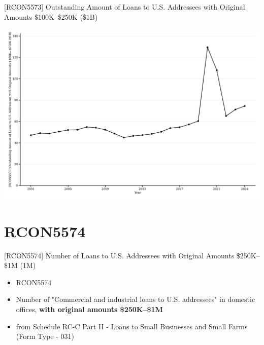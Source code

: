\documentclass{beamer}
\begin{document}
\begin{frame}{[RCON5573] Outstanding Amount of Loans to U.S. Addressees with Original Amounts \$100K–\$250K (\$1B)}
\begin{center}
\includegraphics[width=1\textwidth]{figures/Figure_RCON5573_Outstanding_100K_250K.pdf}
\end{center}
\end{frame}


\section{RCON5574}
\begin{frame}{[RCON5574] Number of Loans to U.S. Addressees with Original Amounts \$250K–\$1M (1M)}
\begin{itemize}
    \item RCON5574
    \item Number of "Commercial and industrial loans to U.S. addressees" in domestic offices, \textbf{with original amounts \$250K–\$1M}
    \item from Schedule RC-C Part II - Loans to Small Businesses and Small Farms (Form Type - 031)
\end{itemize}
\end{frame}
\end{document}
